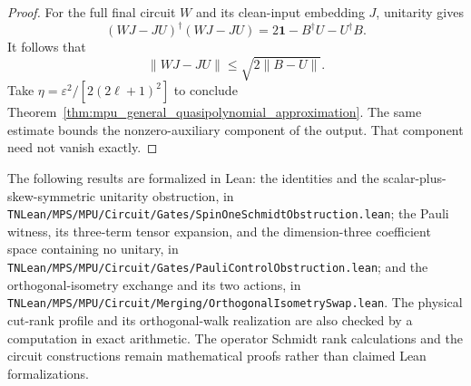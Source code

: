 \documentclass[11pt]{article}
\newcommand{\id}{\mathbf 1}
\begin{document}
\begin{proof}
For the full final circuit $W$ and its clean-input embedding $J$,
unitarity gives
\[
 (WJ-JU)^\dagger(WJ-JU)
   =2\id-B^\dagger U-U^\dagger B.
\]
It follows that
\[
 \|WJ-JU\|\leq\sqrt{2\|B-U\|}.
\]
Take $\eta=\varepsilon^2/[2(2\ell+1)^2]$ to conclude
Theorem~\ref{thm:mpu_general_quasipolynomial_approximation}. The same estimate bounds the nonzero-auxiliary
component of the output. That component need not vanish exactly.

\end{proof}

The following results are formalized in Lean: the identities and
the scalar-plus-skew-symmetric unitarity obstruction, in
\nolinkurl{TNLean/MPS/MPU/Circuit/Gates/SpinOneSchmidtObstruction.lean};
the Pauli witness, its three-term tensor expansion, and the dimension-three
coefficient space containing no unitary, in
\nolinkurl{TNLean/MPS/MPU/Circuit/Gates/PauliControlObstruction.lean}; and
the orthogonal-isometry exchange and its two actions, in
\nolinkurl{TNLean/MPS/MPU/Circuit/Merging/OrthogonalIsometrySwap.lean}.
The physical cut-rank profile and its orthogonal-walk realization are also
checked by a computation in exact arithmetic.
The operator Schmidt rank calculations and the circuit constructions remain
mathematical proofs rather than claimed Lean formalizations.
\end{document}

